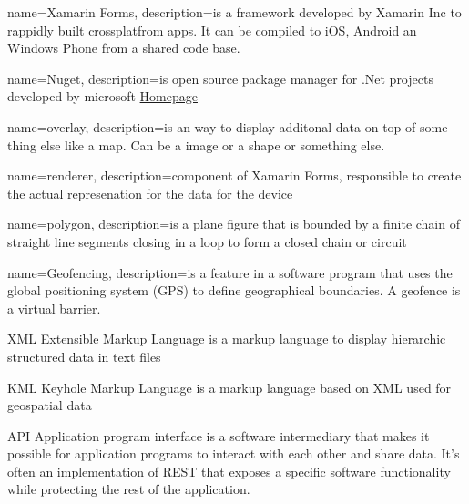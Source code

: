 
{
  name=Xamarin Forms,
  description={is a framework developed by Xamarin Inc to rappidly built crossplatfrom apps. It can be compiled to iOS, Android an Windows Phone from a shared code base.}
}

{
  name=Nuget,
  description={is open source package manager for .Net projects developed by microsoft
  \href{http://nuget.codeplex.com/}{Homepage} }
}

{
  name=overlay,
  description={is an way to display additonal data on top of some thing else like a map. Can be a image or a shape or something else.}
}

{
  name=renderer,
  description={component of Xamarin Forms, responsible to create the actual represenation for the data for the device}
}

{
  name=polygon,
  description={is a plane figure that is bounded by a finite chain of straight line segments closing in a loop to form a closed chain or circuit}
}

{
	name=Geofencing,
	description={is a feature in a software program that uses the global positioning system (GPS) to define geographical boundaries. A geofence is a virtual barrier.}
}


  {XML}            %
  {Extensible Markup Language}  %
  {is a markup language to display hierarchic structured data in text files} %

  {KML}            %
  {Keyhole Markup Language}  %
  {is a markup language based on XML used for geospatial data} %
  
	{API}            %
	{Application program interface}  %
	{is a software intermediary that makes it possible for application programs to interact with each other and share data. It's often an implementation of REST that exposes a specific software functionality while protecting the rest of the application.} %
  
  
